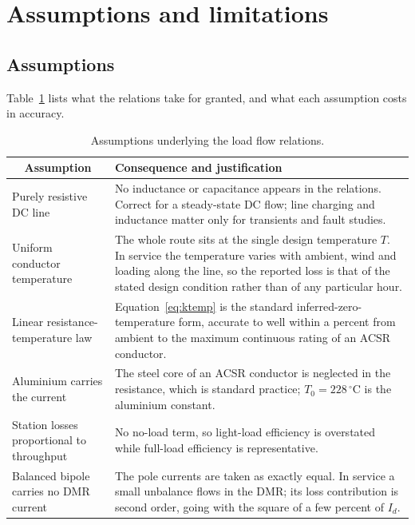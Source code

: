 \section{Assumptions and limitations}
\label{sec:assumptions}

\subsection{Assumptions}
Table~\ref{tab:assumptions} lists what the relations take for granted, and what
each assumption costs in accuracy.

\begin{table}[!ht]
  \centering
  \small
  \renewcommand{\arraystretch}{1.25}
  \begin{tabularx}{\linewidth}{@{}l X@{}}
    \toprule
    \multicolumn{1}{c}{\textbf{Assumption}} & \textbf{Consequence and justification} \\
    \midrule
    Purely resistive DC line
      & No inductance or capacitance appears in the relations. Correct for a
        steady-state DC flow; line charging and inductance matter only for
        transients and fault studies. \\
    Uniform conductor temperature
      & The whole route sits at the single design temperature $T$. In service
        the temperature varies with ambient, wind and loading along the line,
        so the reported loss is that of the stated design condition rather
        than of any particular hour. \\
    Linear resistance-temperature law
      & Equation~\eqref{eq:ktemp} is the standard inferred-zero-temperature
        form, accurate to well within a percent from ambient to the maximum
        continuous rating of an ACSR conductor. \\
    Aluminium carries the current
      & The steel core of an ACSR conductor is neglected in the resistance,
        which is standard practice; $T_{0} = 228\,^{\circ}$C is the aluminium
        constant. \\
    Station losses proportional to throughput
      & No no-load term, so light-load efficiency is overstated while
        full-load efficiency is representative.\\
    Balanced bipole carries no DMR current
      & The pole currents are taken as exactly equal. In service a small
        unbalance flows in the DMR; its loss contribution is second order,
        going with the square of a few percent of $I_{d}$. \\
    \bottomrule
  \end{tabularx}
  \caption{Assumptions underlying the load flow relations.}
  \label{tab:assumptions}
\end{table}

